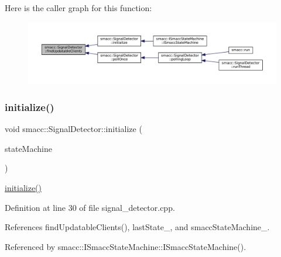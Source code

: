 Here is the caller graph for this function\+:
\nopagebreak
\begin{figure}[H]
\begin{center}
\leavevmode
\includegraphics[width=350pt]{classsmacc_1_1SignalDetector_a47ec2df560e2e33758ce3975bece9385_icgraph}
\end{center}
\end{figure}
\mbox{\label{classsmacc_1_1SignalDetector_a91ab3cd92d8095cdaf8610b50731f04b}} 
\subsubsection{\texorpdfstring{initialize()}{initialize()}}
{\footnotesize\ttfamily void smacc\+::\+Signal\+Detector\+::initialize (\begin{DoxyParamCaption}\item[{\hyperlink{classsmacc_1_1ISmaccStateMachine}{I\+Smacc\+State\+Machine} $\ast$}]{state\+Machine }\end{DoxyParamCaption})}

\hyperlink{classsmacc_1_1SignalDetector_a91ab3cd92d8095cdaf8610b50731f04b}{initialize()} 

Definition at line 30 of file signal\+\_\+detector.\+cpp.



References find\+Updatable\+Clients(), last\+State\+\_\+, and smacc\+State\+Machine\+\_\+.



Referenced by smacc\+::\+I\+Smacc\+State\+Machine\+::\+I\+Smacc\+State\+Machine().


